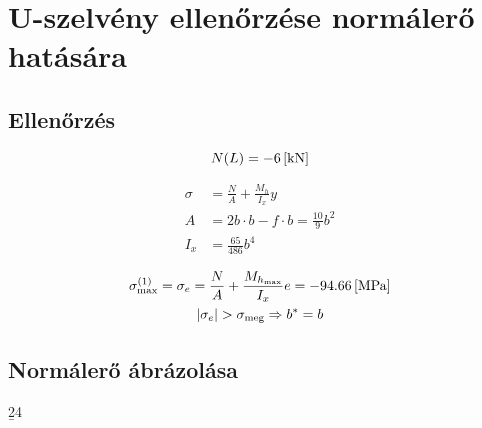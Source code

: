 \section{U-szelvény ellenőrzése normálerő hatására}

\subsection{Ellenőrzés}
\begin{equation*}
	N(L) = \SI{-6}{[\kilo\newton]} 
\end{equation*}

\begin{align*}
	\sigma &= \frac{N}{A} + \frac{M_h}{I_x} y \\
	A &= 2b \cdot b - f \cdot b = \frac{10}{9}b^2 \\
	I_x &= \frac{65}{486} b^4
\end{align*}

\begin{gather*}
	\sigma^{(1)}_\text{max} = \sigma_e 
	= \frac{N}{A} + \frac{M_{h_\text{max}}}{I_x} e 
	= \SI{-94.66}{[\mega\pascal]} \\
	\left|\sigma_e\right| > \sigma_\text{meg} \Rightarrow b^* = b
\end{gather*}

\subsection{Normálerő ábrázolása}

\pgfmathsetmacro\b{24}
\pgfmathsetmacro{}
\pgfmathsetmacro{}
\pgfmathsetmacro{}
\pgfmathsetmacro{}
\pgfmathsetmacro{}
\pgfmathsetmacro{}


\pgfmathsetmacro{}

